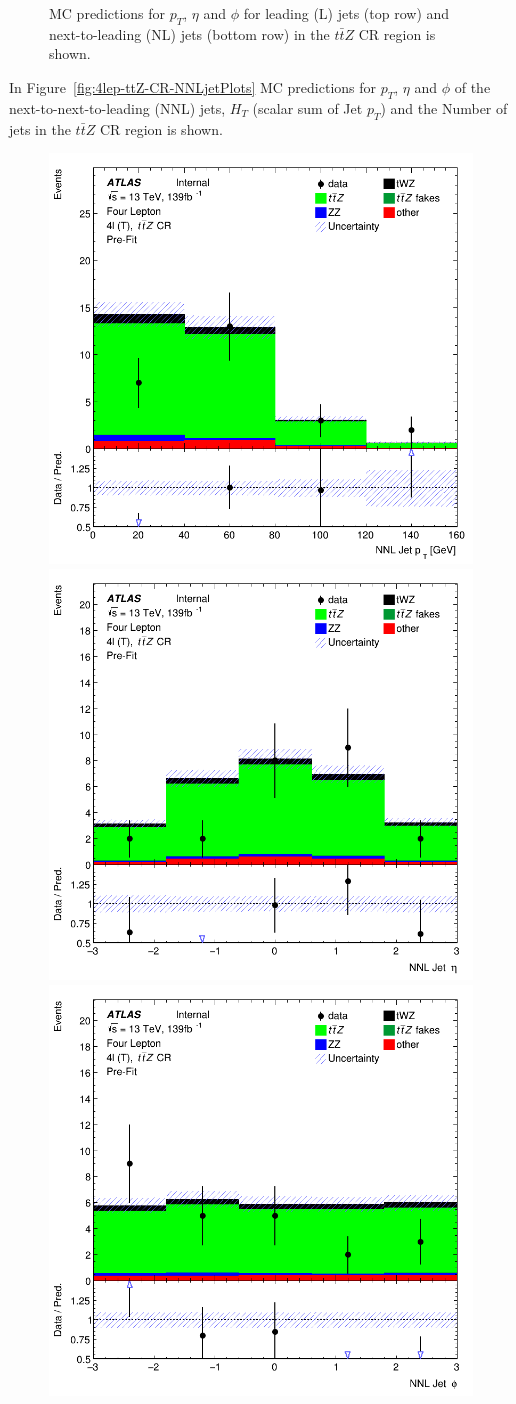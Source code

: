 \begin{figure}[htbp]
\begin{tabular}{ccc}
  \end{tabular}
    \caption{MC predictions for $p_{T}$, $\eta$ and $\phi$ for leading (L) jets (top row) and next-to-leading (NL) jets (bottom row) in the $t\bar{t}Z$ CR region  is shown.}
    \label{fig:4lep-ttZ-CR-LandNjetPlots} 
\end{figure}

In Figure~\ref{fig:4lep-ttZ-CR-NNLjetPlots} MC predictions for $p_{T}$, $\eta$ and $\phi$ of the next-to-next-to-leading (NNL) jets, $H_{T}$ (scalar sum of Jet $p_{T}$) and the Number of jets in the $t\bar{t}Z$ CR region is shown.


\begin{figure}[htbp]
 \centering


    \includegraphics[width=.3\textwidth]{figures/PreFitPlots/lep4_ttZ_4T_NNLJet_pt.png} \quad
    \includegraphics[width=.3\textwidth]{figures/PreFitPlots/lep4_ttZ_4T_NNLJet_eta.png} \quad
    \includegraphics[width=.3\textwidth]{figures/PreFitPlots/lep4_ttZ_4T_NNLJet_phi.png}

    \medskip


\end{figure}
